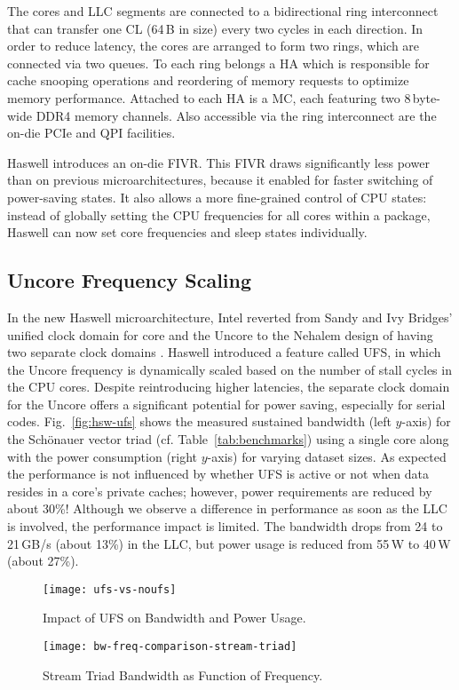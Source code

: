 \documentclass{llncs}
\begin{document}
The cores and \ac{LLC} segments are connected to a bidirectional ring
interconnect that can transfer one \ac{CL} (64\,B in size) every two cycles in
each direction.  In order to reduce latency, the cores are arranged to form two
rings, which are connected via two queues. To each ring belongs a
\ac{HA} which is responsible for cache snooping operations and reordering of
memory requests to optimize memory performance. Attached to each \ac{HA} is a
\ac{MC}, each featuring two 8\,byte-wide DDR4 memory channels.  Also accessible
via the ring interconnect are the on-die PCIe and QPI facilities.

Haswell introduces an on-die \ac{FIVR}. This \ac{FIVR}
draws significantly less power than on previous
microarchitectures, because it enabled for faster switching of
power-saving states. It also allows a more fine-grained control of CPU states:
instead of globally setting the CPU frequencies for all cores within a package,
Haswell can now set core frequencies and sleep states individually.

\subsection{Uncore Frequency Scaling}

In the new Haswell microarchitecture, Intel reverted from Sandy and Ivy
Bridges' unified clock domain for core and the Uncore to the Nehalem design of
having two separate clock domains
\cite{Intel:xeon-e5-v1-overview,Intel:techjournal}.  Haswell introduced a
feature called \ac{UFS}, in which the Uncore frequency is dynamically scaled
based on the number of stall cycles in the CPU cores.  Despite reintroducing
higher latencies, the separate clock domain for the Uncore offers a significant
potential for power saving, especially for serial codes.
Fig.~\ref{fig:hsw-ufs} shows the measured sustained bandwidth (left $y$-axis)
for the Sch\"on\-au\-er vector triad (cf. Table~\ref{tab:benchmarks}) using a
single core along with the power consumption (right $y$-axis) for varying
dataset sizes. As expected the performance is not influenced by whether UFS is
active or not when data resides in a core's private caches; however, power
requirements are reduced by about 30\%!  Although we observe a difference in
performance as soon as the \ac{LLC} is involved, the performance impact is
limited. The bandwidth drops from 24 to 21\,GB/s (about 13\%) in the \ac{LLC},
but power usage is reduced from 55\,W to 40\,W (about 27\%).

\begin{figure}[tb]
\begin{minipage}{.49\textwidth}
    \centering
    \texttt{[image: ufs-vs-noufs]}
    \caption{Impact of \ac{UFS} on Bandwidth and Power Usage.}
    \label{fig:hsw-ufs}
\end{minipage}\hfill
\begin{minipage}{.49\textwidth}
    \centering
    \texttt{[image: bw-freq-comparison-stream-triad]}
    \caption{Stream Triad Bandwidth as Function of Frequency.}
    \label{fig:bw-freq-comparison-stream-triad}
\end{minipage}
\end{figure}
\end{document}
